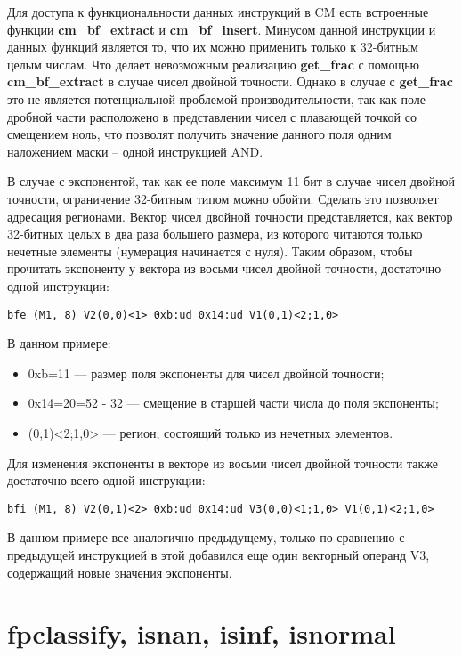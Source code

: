 Для доступа к функциональности данных инструкций в CM есть встроенные функции \textbf{cm\_bf\_extract} и \textbf{cm\_bf\_insert}.
Минусом данной инструкции и данных функций является то, что их можно применить только к 32-битным целым числам.
Что делает невозможным реализацию \textbf{get\_frac} с помощью \textbf{cm\_bf\_extract} в случае чисел двойной точности.
Однако в случае с \textbf{get\_frac} это не является потенциальной проблемой производительности, так как поле дробной части расположено в представлении чисел с плавающей точкой со смещением ноль, что позволят получить значение данного поля одним наложением маски -- одной инструкцией AND.

В случае с экспонентой, так как ее поле максимум 11 бит в случае чисел двойной точности, ограничение 32-битным типом можно обойти.
Сделать это позволяет адресация регионами.
Вектор чисел двойной точности представляется, как вектор 32-битных целых в два раза большего размера, из которого читаются только нечетные элементы (нумерация начинается с нуля).
Таким образом, чтобы прочитать экспоненту у вектора из восьми чисел двойной точности, достаточно одной инструкции:

\begin{lstlisting}
bfe (M1, 8) V2(0,0)<1> 0xb:ud 0x14:ud V1(0,1)<2;1,0>
\end{lstlisting}

В данном примере:

\begin{itemize}
    \item 0xb=11 --- размер поля экспоненты для чисел двойной точности;
    \item 0x14=20=52 - 32 --- смещение в старшей части числа до поля экспоненты;
    \item (0,1)<2;1,0> --- регион, состоящий только из нечетных элементов.
\end{itemize}

Для изменения экспоненты в векторе из восьми чисел двойной точности также достаточно всего одной инструкции:

\begin{lstlisting}
bfi (M1, 8) V2(0,1)<2> 0xb:ud 0x14:ud V3(0,0)<1;1,0> V1(0,1)<2;1,0>
\end{lstlisting}

В данном примере все аналогично предыдущему, только по сравнению с предыдущей инструкцией в этой добавился еще один векторный операнд V3, содержащий новые значения экспоненты.

\section{fpclassify, isnan, isinf, isnormal}

